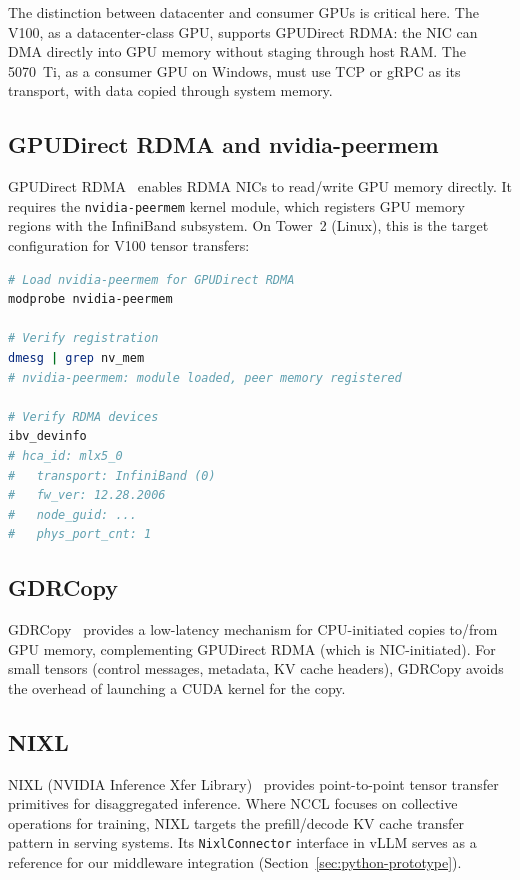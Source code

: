 \documentclass[11pt,letterpaper]{article}
\theoremstyle{definition}
\begin{document}
The distinction between datacenter and consumer GPUs is critical here. The V100, as a datacenter-class GPU, supports GPUDirect RDMA: the NIC can DMA directly into GPU memory without staging through host RAM. The 5070~Ti, as a consumer GPU on Windows, must use TCP or gRPC as its transport, with data copied through system memory.

\subsection{GPUDirect RDMA and nvidia-peermem}

GPUDirect RDMA~\cite{gpudirect-rdma-redhat} enables RDMA NICs to read/write GPU memory directly. It requires the \texttt{nvidia-peermem} kernel module, which registers GPU memory regions with the InfiniBand subsystem. On Tower~2 (Linux), this is the target configuration for V100 tensor transfers:

\begin{lstlisting}[language=bash, caption={GPUDirect RDMA setup on Tower 2}]
# Load nvidia-peermem for GPUDirect RDMA
modprobe nvidia-peermem

# Verify registration
dmesg | grep nv_mem
# nvidia-peermem: module loaded, peer memory registered

# Verify RDMA devices
ibv_devinfo
# hca_id: mlx5_0
#   transport: InfiniBand (0)
#   fw_ver: 12.28.2006
#   node_guid: ...
#   phys_port_cnt: 1
\end{lstlisting}

\subsection{GDRCopy}

GDRCopy~\cite{gdrcopy} provides a low-latency mechanism for CPU-initiated copies to/from GPU memory, complementing GPUDirect RDMA (which is NIC-initiated). For small tensors (control messages, metadata, KV cache headers), GDRCopy avoids the overhead of launching a CUDA kernel for the copy.

\subsection{NIXL}

NIXL (NVIDIA Inference Xfer Library)~\cite{nixl} provides point-to-point tensor transfer primitives for disaggregated inference. Where NCCL focuses on collective operations for training, NIXL targets the prefill/decode KV cache transfer pattern in serving systems. Its \texttt{NixlConnector} interface in vLLM serves as a reference for our middleware integration (Section~\ref{sec:python-prototype}).
\end{document}
